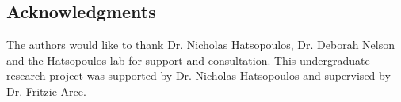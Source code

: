 \documentclass[11pt,a4paper]{article}
\begin{document}
\subsection{Acknowledgments}
The authors would like to thank Dr. Nicholas Hatsopoulos, Dr. Deborah Nelson and the Hatsopoulos lab for support and consultation. This undergraduate research project was supported by Dr. Nicholas Hatsopoulos and supervised by Dr. Fritzie Arce.




\end{document}
